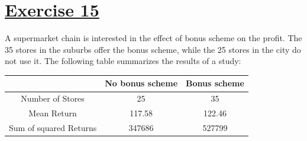 \documentclass[captions=tableheading, 12pt, headings=small, parskip=half]{scrartcl}
\begin{document}
\section*{\underline{Exercise 15}}
A supermarket chain is interested in the effect of bonus scheme on the profit. The 35 stores in the suburbs offer the bonus scheme, while the 25 stores in the city do not use it. The following table summarizes the results of a study:
\begin{table}[h!]
	\centering
	\begin{tabular}{ccc}
		\toprule
		\toprule
		&No bonus scheme & Bonus scheme\\
		\midrule
		Number of Stores&25&35\\
		Mean Return&117.58&122.46\\
		Sum of squared Returns&347686&527799\\
		\bottomrule
		\bottomrule
	\end{tabular}
\end{table}
\end{document}

